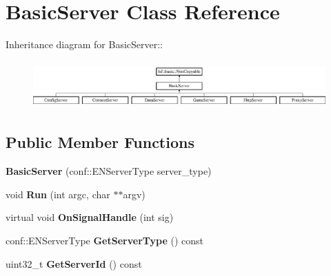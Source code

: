 \hypertarget{classBasicServer}{
\section{BasicServer Class Reference}
\label{classBasicServer}
}
Inheritance diagram for BasicServer::\begin{figure}[H]
\begin{center}
\leavevmode
\includegraphics[height=1.84211cm]{classBasicServer}
\end{center}
\end{figure}
\subsection*{Public Member Functions}
\begin{DoxyCompactItemize}
\item 
\hypertarget{classBasicServer_a41b5f849437c2c2c10aad39d4c1aa467}{
{\bfseries BasicServer} (conf::ENServerType server\_\-type)}
\label{classBasicServer_a41b5f849437c2c2c10aad39d4c1aa467}

\item 
\hypertarget{classBasicServer_a5f35d6e521697cc7f3d46b79f9099d43}{
void {\bfseries Run} (int argc, char $\ast$$\ast$argv)}
\label{classBasicServer_a5f35d6e521697cc7f3d46b79f9099d43}

\item 
\hypertarget{classBasicServer_acb6117cf958dd17fc58c53e072160c24}{
virtual void {\bfseries OnSignalHandle} (int sig)}
\label{classBasicServer_acb6117cf958dd17fc58c53e072160c24}

\item 
\hypertarget{classBasicServer_a0ab208bdd304a570968d0d8b40d65489}{
conf::ENServerType {\bfseries GetServerType} () const }
\label{classBasicServer_a0ab208bdd304a570968d0d8b40d65489}

\item 
\hypertarget{classBasicServer_a18ba2a2df5b031ca51e0f3d263e91173}{
uint32\_\-t {\bfseries GetServerId} () const }
\label{classBasicServer_a18ba2a2df5b031ca51e0f3d263e91173}

\end{DoxyCompactItemize}
